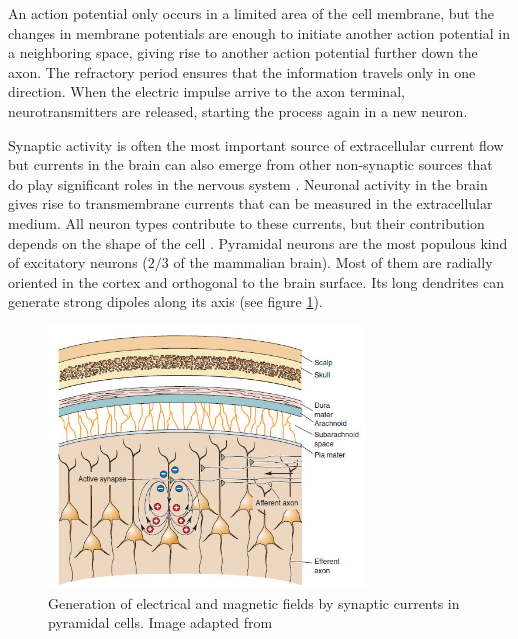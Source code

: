 An action potential only occurs in a limited area of the cell membrane, but the changes in membrane potentials are enough to initiate another action potential in a neighboring space, giving rise to another action potential further down the axon. The refractory period ensures that the information travels only in one direction. When the electric impulse arrive to the axon terminal, neurotransmitters are released, starting the process again in a new neuron. 

Synaptic activity is often the most important source of extracellular current flow \citep{Buzsaki2012} but currents in the brain can also emerge from other non-synaptic sources that do play significant roles in the nervous system \citep{Jefferys1995}. Neuronal activity in the brain gives rise to transmembrane currents that can be measured in the extracellular medium. All neuron types contribute to these currents, but their contribution depends on the shape of the cell \citep{Jefferys1995}. Pyramidal neurons are the most populous kind of excitatory neurons ($2/3$ of the mammalian brain). Most of them are radially oriented in the cortex and orthogonal to the brain surface. Its long dendrites can generate strong dipoles along its axis (see figure \ref{fig:pyramidcell}). 

\begin{figure}[ht]
\centering
\includegraphics[width=0.75\textwidth]{Images/pyramidcell_dipole.jpg}
\caption{Generation of electrical and magnetic fields by synaptic currents in pyramidal cells. Image adapted from \citet{Bear2016}}
\label{fig:pyramidcell}
\end{figure}


